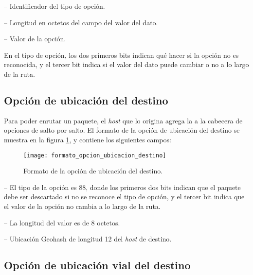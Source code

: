  -- Identificador del tipo de opción.

 -- Longitud en octetos del campo del
valor del dato.

 -- Valor de la opción.

En el tipo de opción, los dos primeros bits indican qué hacer si la opción no
es reconocida, y el tercer bit indica si el valor del dato puede cambiar o no a
lo largo de la ruta.

\subsection{Opción de ubicación del destino}

\label{subsec:opcion_de_ubicacion_del_destino}

Para poder enrutar un paquete, el \textit{host} que lo origina agrega la
 a la cabecera de opciones de salto
por salto. El formato de la opción de ubicación del destino se muestra en la
figura \ref{fig:formato_opcion_ubicacion_destino}, y contiene los siguientes
campos:

\begin{figure}[th!]
\centering
\texttt{[image: formato\_opcion\_ubicacion\_destino]}
\decoRule
\caption[Formato de la opción de ubicación del destino]{Formato de la opción de
ubicación del destino.}
\label{fig:formato_opcion_ubicacion_destino}
\end{figure}

 -- El tipo de la opción es 88, donde los primeros dos
bits indican que el paquete debe ser descartado si no se reconoce el tipo de
opción, y el tercer bit indica que el valor de la opción no cambia a lo largo
de la ruta.

 -- La longitud del valor es de 8 octetos.

 -- Ubicación Geohash de longitud 12 del
\textit{host} de destino.

\subsection{Opción de ubicación vial del destino}

